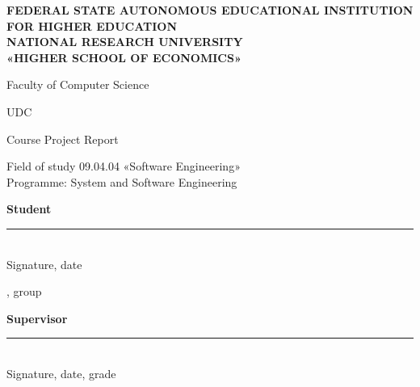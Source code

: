 \begin{titlepage}
\thispagestyle{empty}
\singlespacing
\setlength{\parindent}{0pt}
\setlength{\parskip}{0pt}

\begin{center}
\textbf{FEDERAL STATE AUTONOMOUS EDUCATIONAL INSTITUTION}\\
\textbf{FOR HIGHER EDUCATION}\\
\textbf{NATIONAL RESEARCH UNIVERSITY}\\
\textbf{«HIGHER SCHOOL OF ECONOMICS»}

\vspace{0.3cm}
Faculty of Computer Science
\end{center}

\vspace{0.4cm}
\noindent UDC~\hseUDC

\vspace{2cm}
\begin{center}
{\large\foreignlanguage{russian}{\hseAuthorName}}

\vspace{1.2cm}
{\large\textbf{\hseTitleEn}}

\vspace{0.4cm}
{\foreignlanguage{russian}{\hseTitleRu}}

\vspace{1.2cm}
Course Project Report

\vspace{0.3cm}
Field of study 09.04.04 «Software Engineering»\\
Programme: System and Software Engineering
\end{center}

\vfill
\noindent
\begin{minipage}[t]{0.42\textwidth}
\raggedright
\textbf{Student}\\[0.6cm]
\rule{5cm}{0.4pt}\\[-0.1cm]
{\scriptsize Signature, date}

\vspace{0.2cm}
\foreignlanguage{russian}{\hseAuthorName}, group \foreignlanguage{russian}{\hseGroup}
\end{minipage}
\hfill
\begin{minipage}[t]{0.5\textwidth}
\raggedright
\textbf{Supervisor}\\[0.6cm]
\rule{5cm}{0.4pt}\\[-0.1cm]
{\scriptsize Signature, date, grade}


\end{minipage}
\end{titlepage}
